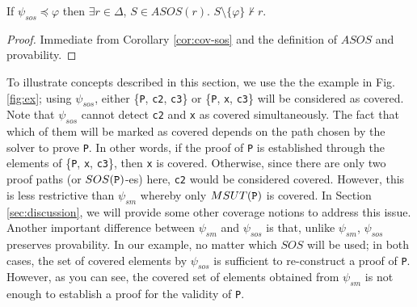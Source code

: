 \begin{theorem}
\label{thm:sos-r}
If $\psi_{sos} \preccurlyeq \varphi$ then $\exists r \in \Delta$, $S \in ASOS(r)$.
$S \setminus \{\varphi \} \nvdash r$.
\end{theorem}
\begin{proof}
Immediate from Corollary \ref{cor:cov-sos} and the definition of $ASOS$ and provability.
\end{proof}
\vspace{2mm}
To illustrate concepts described in this section, we use the the example in Fig. \ref{fig:ex};
using $\psi_{sos}$, either \{{\tt P}, {\tt c2}, {\tt c3}\} or
 \{{\tt P}, {\tt x}, {\tt c3}\} will be considered as covered. Note that
 $\psi_{sos}$ cannot detect {\tt c2} and {\tt x} as covered simultaneously.
 The fact that which of them will be marked as covered depends on
 the path chosen by the solver to prove {\tt P}. In other words,
 if the proof of {\tt P} is established through the elements of \{{\tt P}, {\tt x}, {\tt c3}\},
 then {\tt x} is covered. Otherwise, since there are only two proof paths (or $SOS({\tt P})$-es)
 here, {\tt c2} would be considered covered. However, this is less restrictive than $\psi_{sm}$ whereby only $MSUT({\tt P})$ is covered. In Section \ref{sec:discussion}, we will provide some other coverage notions to address this issue.
 Another important difference between $\psi_{sm}$ and $\psi_{sos}$ is that, unlike $\psi_{sm}$,
 $\psi_{sos}$ preserves provability. In our example, no matter which $SOS$ will be used;
 in both cases, the set of covered elements by $\psi_{sos}$ is sufficient to re-construct a proof of {\tt P}.
 However, as you can see, the covered set of elements obtained from $\psi_{sm}$ is not
 enough to establish a proof for the validity of {\tt P}.
